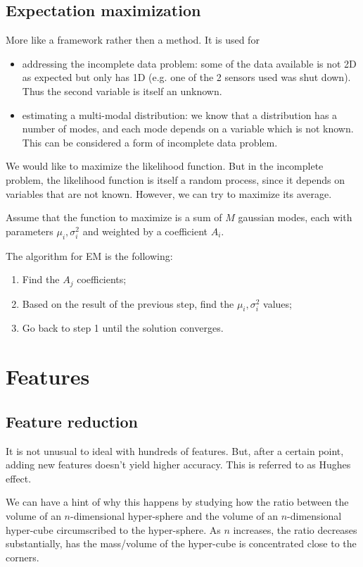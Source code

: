 \documentclass[oneside,onecolumn]{report}
\begin{document}
\section{Expectation maximization}
More like a framework rather then a method.
It is used for
\begin{itemize}
    \item addressing the incomplete data problem: some of the data available is not 2D as expected but only has 1D (e.g. one of the 2 sensors used was shut down). Thus the second variable is itself an unknown.
    \item estimating a multi-modal distribution: we know that a distribution has a number of modes, and each mode depends on a variable which is not known. This can be considered a form of incomplete data problem.
\end{itemize}

We would like to maximize the likelihood function.
But in the incomplete problem, the likelihood function is itself a random process, since it depends on variables that are not known.
However, we can try to maximize its average.

Assume that the function to maximize is a sum of $M$ gaussian modes, each with parameters $\mu_i, \sigma_i^2$ and weighted by a coefficient $A_i$.

The algorithm for EM is the following:
\begin{enumerate}
    \item Find the $A_j$ coefficients;
    \item Based on the result of the previous step, find the $\mu_i, \sigma_i^2$ values;
    \item Go back to step 1 until the solution converges.
\end{enumerate}


\clearpage
\chapter{Features}
\section{Feature reduction}
It is not unusual to ideal with hundreds of features.
But, after a certain point, adding new features doesn't yield higher accuracy.
This is referred to as Hughes effect.

We can have a hint of why this happens by studying how the ratio between the volume of an $n$-dimensional hyper-sphere and the volume of an $n$-dimensional hyper-cube circumscribed to the hyper-sphere.
As $n$ increases, the ratio decreases substantially, has the mass/volume of the hyper-cube is concentrated close to the corners.
\end{document}
